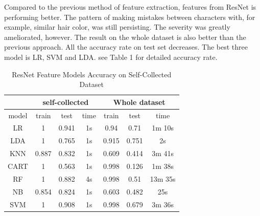 \documentclass[11.5pt]{article}
\begin{document}
\begin{enumerate}
\begin{itemize}
            Compared to the previous method of feature extraction, features from ResNet is performing better.
            The pattern of making mistakes between characters with, for example, similar hair color, was still persisting.
            The severity was greatly ameliorated, however.
            The result on the whole dataset is also better than the previous approach.
            All the accuracy rate on test set decreases.
            The best three model is LR, SVM and LDA\@.
            see Table 1 for detailed accuracy rate.
            \begin{table}[h!]
                \centering
                \caption{ResNet Feature Models Accuracy on Self-Collected Dataset}
                    \begin{tabular}{|c|c|c|c|c|c|c|}
                        \hline
                         & \multicolumn{3}{|c|}{self-collected} & \multicolumn{3}{|c|}{Whole dataset} \\ \hline
                        model & train & test & time & train & test & time \\ \hline
                        LR & 1 & 0.941 & 1s & 0.94 & 0.71 & 1m 10s \\ \hline
                        LDA  & 1 & 0.765 & 1s & 0.915 & 0.751 & 2s \\ \hline
                        KNN & 0.887 & 0.832 & 1s & 0.609 & 0.414 & 3m 41s \\ \hline
                        CART & 1 & 0.563 & 1s & 0.998 & 0.126 & 1m 38s \\ \hline
                        RF & 1 & 0.882 & 4s & 0.998 & 0.51 & 13m 35s\\ \hline
                        NB & 0.854 & 0.824 & 1s & 0.603 & 0.482 & 25s \\ \hline
                        SVM  & 1 & 0.908 & 1s & 0.998 & 0.679 & 3m 36s \\ \hline
                    \end{tabular}
            \end{table}

\end{itemize}
\end{enumerate}
\end{document}
